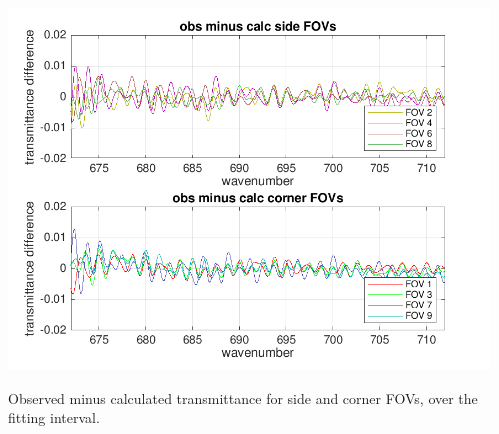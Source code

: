\documentclass[10pt]{beamer}
\begin{document}
\begin{frame}
\begin{columns}[t]
\begin{column}{0.5\textwidth}
\end{column}
\begin{column}{0.5\textwidth}  
  \begin{centering}
  \includegraphics[width=\textwidth]{01-07_pfl_s1_CO2/CO2_breakout_2.png}
  \end{centering}\vspace{3mm}

Observed minus calculated transmittance for side and corner FOVs,
over the fitting interval.

\end{column}
\end{columns}
\end{frame}
\end{document}
